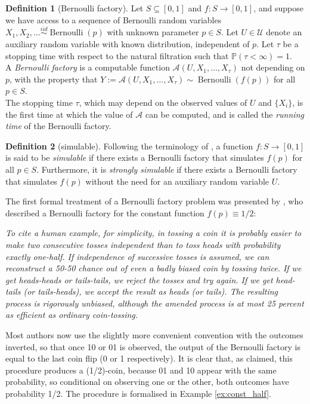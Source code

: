 \documentclass{article}
\theoremstyle{definition}
\newtheorem{defn}{Definition}
\newcommand{\PR}{\mathbb{P}}
\newcommand{\iidsim}{\overset{iid}{\sim}}
\newcommand{\Bern}{\operatorname{Bernoulli}}
\begin{document}
\begin{defn}[Bernoulli factory]\label{defn:BF}
Let $S \subseteq [0,1]$ and $f: S\to[0,1]$, and suppose we have access to a sequence of Bernoulli random variables $X_1,X_2,\dots \iidsim \Bern(p)$ with unknown parameter $p \in S$.
Let $U \in \mathcal{U}$ denote an auxiliary random variable with known distribution, independent of $p$. Let $\tau$ be a stopping time with respect to the natural filtration such that $\PR(\tau<\infty)=1$.\\
A \emph{Bernoulli factory} is a computable function $\mathcal{A}(U, X_1, \dots, X_\tau)$ not depending on $p$, with the property that $Y:=\mathcal{A}(U, X_1, \dots, X_\tau) \sim \Bern(f(p))$ for all $p\in S$.\\
The stopping time $\tau$, which may depend on the observed values of $U$ and $\{X_i\}$, is the first time at which the value of $\mathcal{A}$ can be computed, and is called the \emph{running time} of the Bernoulli factory.
\end{defn}

\begin{defn}[simulable]
Following the terminology of \citet{keane1994}, a function $f:S\to[0,1]$ is said to be \emph{simulable} if there exists a Bernoulli factory that simulates $f(p)$ for all $p\in S$.
Furthermore, it is \emph{strongly simulable} if there exists a Bernoulli factory that simulates $f(p)$ without the need for an auxiliary random variable $U$.
\end{defn}

The first formal treatment of a Bernoulli factory problem was presented by \citet{vonneumann1951}, who 
described a Bernoulli factory for the constant function $f(p)\equiv 1/2$:
\begin{displayquote}
\textit{To cite a human example, for simplicity, in tossing a coin it is probably easier to make two consecutive tosses independent than to toss heads with probability exactly one-half. If independence of successive tosses is assumed, we can reconstruct a 50-50 chance out of even a badly biased coin by tossing twice. If we get heads-heads or tails-tails, we reject the tosses and try again. If we get head-tails (or tails-heads), we accept the result as heads (or tails). The resulting process is rigorously unbiased, although the amended process is at most 25 percent as efficient as ordinary coin-tossing.}
\end{displayquote}

Most authors now use the slightly more convenient convention with the outcomes inverted, so that once 10 or 01 is observed, the output of the Bernoulli factory is equal to the last coin flip (0 or 1 respectively). 
It is clear that, as claimed, this procedure produces a (1/2)-coin, because 01 and 10 appear with the same probability, so conditional on observing one or the other, both outcomes have probability 1/2.
The procedure is formalised in Example \ref{ex:const_half}.
\end{document}
